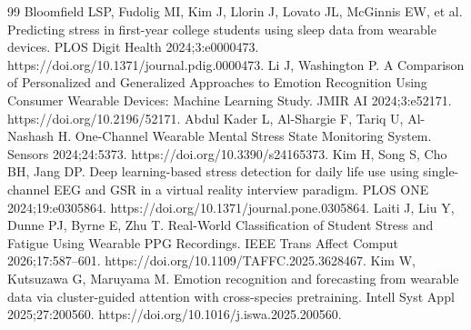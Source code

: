 \begin{thebibliography}{99}
 Bloomfield LSP, Fudolig MI, Kim J, Llorin J, Lovato JL, McGinnis EW, et al. Predicting stress in first-year college students using sleep data from wearable devices. PLOS Digit Health 2024;3:e0000473. https://doi.org/10.1371/journal.pdig.0000473.
 Li J, Washington P. A Comparison of Personalized and Generalized Approaches to Emotion Recognition Using Consumer Wearable Devices: Machine Learning Study. JMIR AI 2024;3:e52171. https://doi.org/10.2196/52171.
 Abdul Kader L, Al-Shargie F, Tariq U, Al-Nashash H. One-Channel Wearable Mental Stress State Monitoring System. Sensors 2024;24:5373. https://doi.org/10.3390/s24165373.
 Kim H, Song S, Cho BH, Jang DP. Deep learning-based stress detection for daily life use using single-channel EEG and GSR in a virtual reality interview paradigm. PLOS ONE 2024;19:e0305864. https://doi.org/10.1371/journal.pone.0305864.
 Laiti J, Liu Y, Dunne PJ, Byrne E, Zhu T. Real-World Classification of Student Stress and Fatigue Using Wearable PPG Recordings. IEEE Trans Affect Comput 2026;17:587--601. https://doi.org/10.1109/TAFFC.2025.3628467.
 Kim W, Kutsuzawa G, Maruyama M. Emotion recognition and forecasting from wearable data via cluster-guided attention with cross-species pretraining. Intell Syst Appl 2025;27:200560. https://doi.org/10.1016/j.iswa.2025.200560.
\end{thebibliography}
